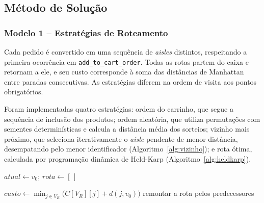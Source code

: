 \subsection{Método de Solução}
\label{ssec:metodo}

\subsubsection*{Modelo 1 -- Estratégias de Roteamento}

Cada pedido é convertido em uma sequência de \textit{aisles} distintos, respeitando a primeira ocorrência em \texttt{add\_\allowbreak to\_\allowbreak cart\_\allowbreak order}. Todas as rotas partem do caixa e retornam a ele, e seu custo corresponde à soma das distâncias de Manhattan entre paradas consecutivas. As estratégias diferem na ordem de visita aos pontos obrigatórios.

Foram implementadas quatro estratégias: ordem do carrinho, que segue a sequência de inclusão dos produtos; ordem aleatória, que utiliza permutações com sementes determinísticas e calcula a distância média dos sorteios; vizinho mais próximo, que seleciona iterativamente o \textit{aisle} pendente de menor distância, desempatando pelo menor identificador \citep{rosenkrantz1977} (Algoritmo~\ref{alg:vizinho}); e rota ótima, calculada por programação dinâmica de Held-Karp \citep{heldkarp1962} (Algoritmo~\ref{alg:heldkarp}).


\begin{algorithm}[!ht]
\small
{}
$atual \leftarrow v_0$; $rota \leftarrow [\,]$\;
\caption{Vizinho mais próximo}
\label{alg:vizinho}
\end{algorithm}

\begin{algorithm}[!ht]
\small
{}
$custo \leftarrow \min_{j \in V_R} \big(C[V_R][j] + d(j, v_0)\big)$\;
remontar a rota pelos predecessores\;
\caption{Rota ótima (Held-Karp)}
\label{alg:heldkarp}
\end{algorithm}

